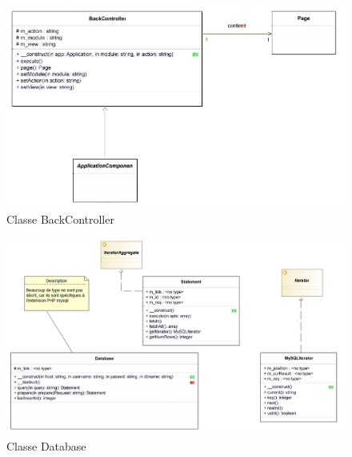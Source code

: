     \begin{figure}[h]
        \begin{center}
            \includegraphics[scale=0.7]{images/uml/classes/BackController.png} 
        \end{center}

        \caption{Classe BackController}
        \label{Classe BackController}
    \end{figure}


    \begin{figure}[h]
        \begin{center}
            \includegraphics[angle=90, scale=0.8]{images/uml/classes/Database.png} 
        \end{center}

        \caption{Classe Database}
        \label{Classe Database}
    \end{figure}


